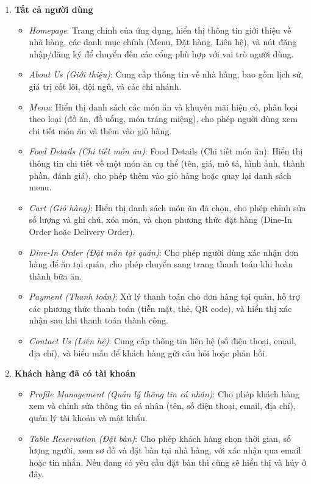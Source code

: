 \begin{enumerate}
	\item \textbf{Tất cả người dùng}
	      \begin{itemize}
		      \item \textit{Homepage}: Trang chính của ứng dụng, hiển thị thông tin giới thiệu về nhà hàng, các danh mục chính (Menu, Đặt hàng, Liên hệ), và nút đăng nhập/đăng ký để chuyển đến các cổng phù hợp với vai trò người dùng.
		      \item \textit{About Us (Giới thiệu)}: Cung cấp thông tin về nhà hàng, bao gồm lịch sử, giá trị cốt lõi, đội ngũ, và các chi nhánh.
		      \item \textit{Menu}: Hiển thị danh sách các món ăn và khuyến mãi hiện có, phân loại theo loại (đồ ăn, đồ uống, món tráng miệng), cho phép người dùng xem chi tiết món ăn và thêm vào giỏ hàng.
		      \item \textit{Food Details (Chi tiết món ăn)}: Food Details (Chi tiết món ăn): Hiển thị thông tin chi tiết về một món ăn cụ thể (tên, giá, mô tả, hình ảnh, thành phần, đánh giá), cho phép thêm vào giỏ hàng hoặc quay lại danh sách menu.
		      \item \textit{Cart (Giỏ hàng)}: Hiển thị danh sách món ăn đã chọn, cho phép chỉnh sửa số lượng và ghi chú, xóa món, và chọn phương thức đặt hàng (Dine-In Order hoặc Delivery Order).
		      \item \textit{Dine-In Order (Đặt món tại quán)}: Cho phép người dùng xác nhận đơn hàng để ăn tại quán, cho phép chuyển sang trang thanh toán khi hoàn thành bữa ăn.
		      \item \textit{Payment (Thanh toán)}: Xử lý thanh toán cho đơn hàng tại quán, hỗ trợ các phương thức thanh toán (tiền mặt, thẻ, QR code), và hiển thị xác nhận sau khi thanh toán thành công.
		      \item \textit{Contact Us (Liên hệ)}: Cung cấp thông tin liên hệ (số điện thoại, email, địa chỉ), và biểu mẫu để khách hàng gửi câu hỏi hoặc phản hồi.
	      \end{itemize}
	\item \textbf{Khách hàng đã có tài khoản}
	      \begin{itemize}
		      \item \textit{Profile Management (Quản lý thông tin cá nhân)}: Cho phép khách hàng xem và chỉnh sửa thông tin cá nhân (tên, số điện thoại, email, địa chỉ), quản lý tài khoản và mật khẩu.
		      \item \textit{Table Reservation (Đặt bàn)}: Cho phép khách hàng chọn thời gian, số lượng người, xem sơ đồ và đặt bàn tại nhà hàng, với xác nhận qua email hoặc tin nhắn. Nếu đang có yêu cầu đặt bàn thì cũng sẽ hiển thị và hủy ở đây.

\end{itemize}
\end{enumerate}
